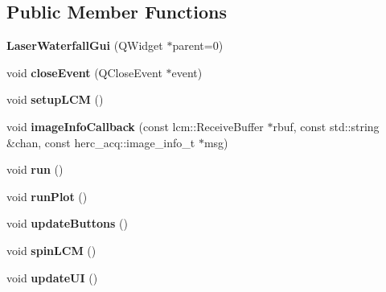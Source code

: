 \subsection*{Public Member Functions}
\begin{DoxyCompactItemize}
\item 
{\bfseries Laser\+Waterfall\+Gui} (Q\+Widget $\ast$parent=0)\hypertarget{classLaserWaterfallGui_a91cf374c6c4eb453799557dc645cb78b}{}\label{classLaserWaterfallGui_a91cf374c6c4eb453799557dc645cb78b}

\item 
void {\bfseries close\+Event} (Q\+Close\+Event $\ast$event)\hypertarget{classLaserWaterfallGui_a35d8566bdc885146ad7e25a75f1be808}{}\label{classLaserWaterfallGui_a35d8566bdc885146ad7e25a75f1be808}

\item 
void {\bfseries setup\+L\+CM} ()\hypertarget{classLaserWaterfallGui_a6d6ca7b49cd38713c9b86026d1e4a504}{}\label{classLaserWaterfallGui_a6d6ca7b49cd38713c9b86026d1e4a504}

\item 
void {\bfseries image\+Info\+Callback} (const lcm\+::\+Receive\+Buffer $\ast$rbuf, const std\+::string \&chan, const herc\+\_\+acq\+::image\+\_\+info\+\_\+t $\ast$msg)\hypertarget{classLaserWaterfallGui_a54124a8f6088e7a2b3d52be9908f04c1}{}\label{classLaserWaterfallGui_a54124a8f6088e7a2b3d52be9908f04c1}

\item 
void {\bfseries run} ()\hypertarget{classLaserWaterfallGui_a58aefa7c4c0f9044813e5a7c58a82c74}{}\label{classLaserWaterfallGui_a58aefa7c4c0f9044813e5a7c58a82c74}

\item 
void {\bfseries run\+Plot} ()\hypertarget{classLaserWaterfallGui_a6fa986bd4e35f18191073b608a75654a}{}\label{classLaserWaterfallGui_a6fa986bd4e35f18191073b608a75654a}

\item 
void {\bfseries update\+Buttons} ()\hypertarget{classLaserWaterfallGui_a096e26ceb5215a08526e58209a2522a2}{}\label{classLaserWaterfallGui_a096e26ceb5215a08526e58209a2522a2}

\item 
void {\bfseries spin\+L\+CM} ()\hypertarget{classLaserWaterfallGui_a67a5bbe1a76979ea8f1c3bb7c380608b}{}\label{classLaserWaterfallGui_a67a5bbe1a76979ea8f1c3bb7c380608b}

\item 
void {\bfseries update\+UI} ()\hypertarget{classLaserWaterfallGui_ad3ec36cceab31f2bcccdaf8b05f6a5ab}{}\label{classLaserWaterfallGui_ad3ec36cceab31f2bcccdaf8b05f6a5ab}


\end{DoxyCompactItemize}
